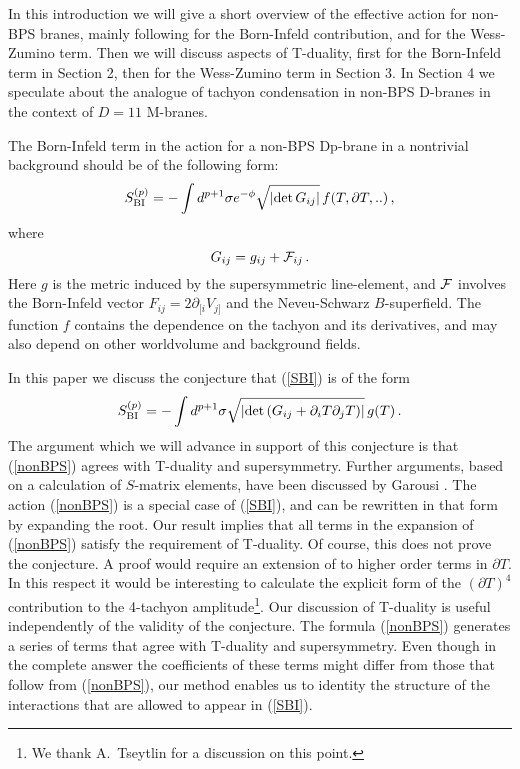 \documentclass[12pt,a4paper]{article}
\begin{document}
In this introduction we will give a short overview of the effective action
 for non-BPS branes, mainly following \cite{Sen5} for the Born-Infeld
 contribution, and \cite{Billo,Ken} for the Wess-Zumino term. Then we will
 discuss aspects of T-duality, first for the Born-Infeld term in Section 2,
 then for the Wess-Zumino term in Section 3. In  Section 4 we
 speculate about the analogue of tachyon condensation in non-BPS
 D-branes in the context of $D=11$ M-branes.

The Born-Infeld term in the action for  a non-BPS Dp-brane in a nontrivial
 background should be of the following
 form:
\begin{equation}
\label{SBI}
   S^{(p)}_{{\rm BI}} = -\int d^{p+1}\sigma e^{-\phi} \sqrt{|{\rm det}\, G_{ij}|}
        \, f(T,\partial T,..)\,,
\end{equation}
where
\begin{equation}
   G_{ij} = g_{ij} + {\cal F}_{ij}\,.
\end{equation}
Here $g$ is the metric induced by the supersymmetric line-element, and
 ${\cal F}$ involves the Born-Infeld vector
 $F_{ij}=2\partial_{[i}V_{j]}$ and the Neveu-Schwarz
 $B$-superfield. The function $f$ contains the dependence on the tachyon and
 its derivatives, and may also depend on other worldvolume and background
 fields.

 In this paper we discuss the conjecture  that (\ref{SBI})
  is of the form
 \begin{equation}
 \label{nonBPS}
    S_{\rm BI}^{(p)} =  -\int d^{p+1}\sigma \sqrt{ |{\rm det}\, ({G}_{ij} +
      \partial_iT\partial_jT)|}\,g(T)\,.
 \end{equation}
 The argument which we will advance in support of this conjecture is that
  (\ref{nonBPS}) agrees with T-duality and supersymmetry. Further arguments,
  based on a calculation of $S$-matrix elements, have been discussed
  by Garousi \cite{Gar}. The action (\ref{nonBPS}) is a special case
  of (\ref{SBI}), and can be rewritten in that form by expanding the
  root. Our result implies that all terms in the expansion
  of (\ref{nonBPS})
  satisfy the requirement of T-duality.
  Of course, this does not prove the conjecture.
  A proof would require an extension of \cite{Gar} to higher order terms
  in $\partial T$. In this respect it would be interesting to calculate
  the explicit form of the $(\partial T)^4$ contribution to the
  4-tachyon amplitude\footnote{We
  thank A.~Tseytlin for a discussion on this point.}.
  Our discussion of T-duality is useful independently of
  the validity of the conjecture. The formula (\ref{nonBPS}) generates a
  series of terms that agree with T-duality and supersymmetry. Even though
  in the complete answer the coefficients of these terms might differ from
  those that follow from (\ref{nonBPS}), our method enables us to identity
  the structure of the interactions that are allowed to appear in
  (\ref{SBI}).
\end{document}
